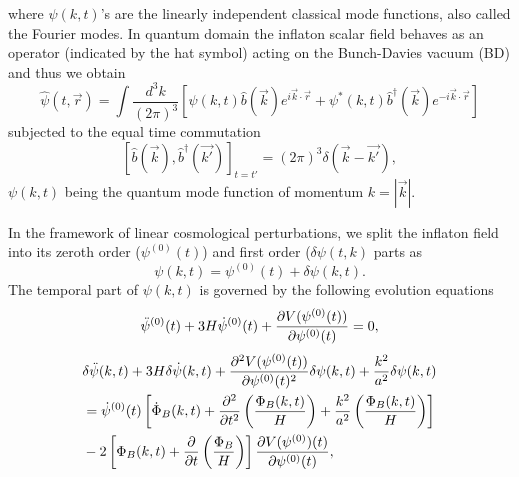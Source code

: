 \documentclass[a4paper,11pt]{article}
\begin{document}
where $\psi(k,t)$'s are the linearly independent classical mode functions, also called the Fourier modes. In quantum domain the inflaton scalar field behaves as an operator (indicated by the hat symbol) acting on the Bunch-Davies vacuum (BD) \cite{Bunch:1978yq,Birrell:1982ix,Kundu:2011sg} and thus we obtain
\begin{equation}
 \hat{\psi}(t,\Vec{r})=\int\frac{d^3 k}{(2\pi)^3}\left[\psi(k,t)\hat{b}(\Vec{k})e^{i\Vec{k}\cdot\Vec{r}}+\psi^{*}(k,t)\hat{b}^{\dagger}(\Vec{k})e^{-i\Vec{k}\cdot\Vec{r}}\right]
\end{equation}
subjected to the equal time commutation
\begin{equation}
    \left[\hat{b}(\Vec{k}),\hat{b}^{\dagger}(\Vec{k'})\right]_{t=t'}=(2\pi)^3\delta (\Vec{k}-\Vec{k'}),
\end{equation}
$\psi (k,t)$ being the quantum mode function of momentum $k=|\Vec{k}|$.\par In the framework of linear cosmological perturbations, we split the inflaton field into its zeroth order ($\psi^{(0)} (t)$) and first order ($\delta\psi(t,k)$ parts as
\begin{equation}
    \psi(k,t)=\psi^{(0)} (t)+\delta\psi(k,t).
\end{equation}
The temporal part of $\psi(k,t)$ is governed by the following evolution equations \cite{Sarkar:2021ird}
\begin{equation}
    \Ddot{\psi}^{(0)}(t)+3H\Dot{\psi}^{(0)}(t)+\frac{\partial V(\psi^{(0)}(t))}{\partial\psi^{(0)}(t)}=0,
    \label{eq:modeEQ1}
\end{equation}
\begin{equation}
    \begin{split}
        &\delta\Ddot{\psi}(k,t)+3H\delta\Dot{\psi}(k,t)+\frac{\partial^2V(\psi^{(0)}(t))}{\partial\psi^{(0)}(t)^2}\delta\psi(k,t)+\frac{k^2}{a^2}\delta\psi(k,t)\\
        &=\Dot{\psi}^{(0)}(t)\left[\Dot{\Phi}_B(k,t)+\frac{\partial^2}{\partial t^2}\left(\frac{\Phi_B(k,t)}{H}\right)+\frac{k^2}{a^2}\left(\frac{\Phi_B(k,t)}{H}\right)\right]\\
        &-2\left[\Phi_B(k,t)+\frac{\partial}{\partial t}\left(\frac{\Phi_B}{H}\right)\right]\frac{\partial V(\psi^{(0)})(t)}{\partial\psi^{(0)}(t)},
    \end{split}
    \label{eq:modeEQ2}
\end{equation}
\end{document}
